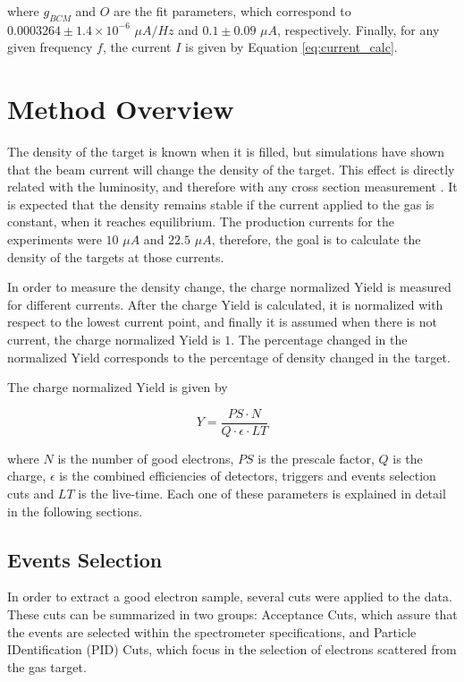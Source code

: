 \documentclass[final,5p,times,twocolumn,balance]{elsarticle}
\begin{document}
\noindent where $g_{BCM}$ and $O$ are the fit parameters, which correspond to $0.0003264 \pm 1.4 \times 10^{-6}$ $\mu A/Hz$ and $0.1 \pm 0.09$  $\mu A$, respectively. Finally, for any given 
frequency $f$, the current $I$ is given by Equation \ref{eq:current_calc}.

\section{Method Overview}

The density of the target is known when it is filled, but simulations have shown that the beam current will change the density of the target. This effect is directly related with the luminosity, and therefore with any cross section measurement \cite{celldes}. It is expected that the density remains stable if the current applied to the gas is constant, when it reaches equilibrium. The production currents for the experiments were $10$ $\mu A$ and $22.5$ $\mu A$, therefore, the goal is to calculate the density of the targets at those currents.  

In order to measure the density change, the charge normalized Yield is measured for different currents. After the charge Yield is calculated, it is normalized with respect to the lowest current point, and finally it is assumed when there is not current, the charge normalized Yield is $1$. The percentage changed in the normalized Yield corresponds to the percentage of density changed in the target. 

The charge normalized Yield is given by 

\begin{equation}
Y = \frac{PS \cdot N}{ Q \cdot \epsilon \cdot LT }
\label{eq:yield}
\end{equation}

\noindent where $N$ is the number of good electrons, $PS$ is the prescale factor, $Q$ is the charge, $\epsilon $ is the combined efficiencies of detectors, triggers and events selection cuts and $LT$ is the live-time. Each one of these parameters is explained in detail in the following sections.

\subsection{Events Selection}
In order to extract a good electron sample, several cuts were applied to the data. These cuts can be summarized in two groups: Acceptance Cuts, which assure that the events are selected within the spectrometer specifications, and Particle IDentification (PID) Cuts, which focus in the selection of electrons scattered from the gas target. 
\end{document}
